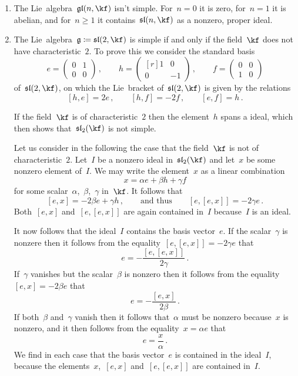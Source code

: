 \begin{examples}
  \leavevmode
  \begin{enumerate}
    \item
      The Lie~algebra~$\gllie(n, \kf)$ isn’t simple.
      For~$n = 0$ it is zero, for~$n = 1$ it is abelian, and for~$n \geq 1$ it contains~$\sllie(n,\kf)$ as a nonzero, proper ideal.
    \item
      The Lie~algebra~$\glie \defined \sllie(2, \kf)$ is simple if and only if the field~$\kf$ does not have characteristic~$2$.
      To prove this we consider the standard basis
      \[
        e
        =
        \begin{pmatrix}
          0 & 1 \\
          0 & 0
        \end{pmatrix} \,,
        \qquad
        h
        =
        \begin{pmatrix*}[r]
          1 &  0  \\
          0 & -1
        \end{pmatrix*} \,,
        \qquad
        f
        =
        \begin{pmatrix}
          0 & 0 \\
          1 & 0
        \end{pmatrix}
      \]
      of~$\sllie(2, \kf)$, on which the Lie~bracket of~$\sllie(2, \kf)$ is given by the relations
      \[
        [h,e] = 2e  \,,
        \qquad
        [h,f] = -2 f \,,
        \qquad
        [e,f] = h \,.
      \]
      
      If the field~$\kf$ is of characteristic~$2$ then the element~$h$ spans a {\onedimensional} ideal, which then shows that~$\sllie_2(\kf)$ is not simple.
      
      Let us consider in the following the case that the field~$\kf$ is not of characteristic~$2$.
      Let~$I$ be a nonzero ideal in~$\sllie_2(\kf)$ and let~$x$ be some nonzero element of~$I$.
      We may write the element~$x$ as a linear combination
      \[
        x = \alpha e + \beta h + \gamma f
      \]
      for some scalar~$\alpha$,~$\beta$,~$\gamma$ in~$\kf$.
      It follows that
      \[
        [e,x]
        =
        -2 \beta e + \gamma h \,,
        \qquad \text{and thus}\qquad
        [e,[e,x]]
        =
        -2 \gamma e \,.
      \]
      Both~$[e,x]$ and~$[e,[e,x]]$ are again contained in~$I$ because~$I$ is an ideal.

      It now follows that the ideal~$I$ contains the basis vector~$e$.
      If the scalar~$\gamma$ is nonzere then it follows from the equality~$[e,[e,x]] = -2 \gamma e$ that
      \[
        e
        =
        - \frac{ [e,[e,x]] }{ 2\gamma } \,.
      \]
      If~$\gamma$ vanishes but the scalar~$\beta$ is nonzero then it follows from the equality$[e,x] = -2 \beta e$ that
      \[
        e
        =
        -\frac{ [e,x] }{ 2\beta } \,.
      \]
      If both~$\beta$ and~$\gamma$ vanish then it follows that~$\alpha$ must be nonzero because~$x$ is nonzero, and it then follows from the equality~$x = \alpha e$ that
      \[
        e = \frac{x}{\alpha} \,.
      \]
      We find in each case that the basis vector~$e$ is contained in the ideal~$I$, because the elements~$x$,~$[e,x]$ and~$[e,[e,x]]$ are contained in~$I$.
      

\end{enumerate}
\end{examples}
